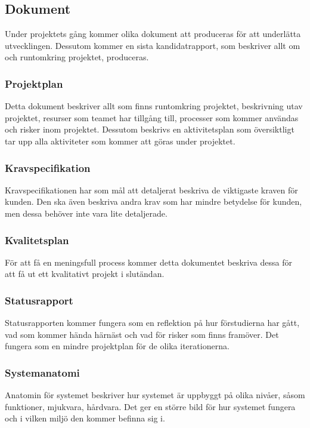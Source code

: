 \subsection{Dokument}
Under projektets gång kommer olika dokument att produceras för att underlätta utvecklingen.
Dessutom kommer en sista kandidatrapport, som beskriver allt om och runtomkring projektet,
produceras.

\subsubsection*{Projektplan}
Detta dokument beskriver allt som finns runtomkring projektet, beskrivning utav projektet, 
resurser som teamet har tillgång till, processer som kommer användas och risker inom projektet.
Dessutom beskrivs en aktivitetsplan som översiktligt tar upp alla aktiviteter som kommer att
göras under projektet.

\subsubsection*{Kravspecifikation}
Kravspecifikationen har som mål att detaljerat beskriva de viktigaste kraven för kunden.
Den ska även beskriva andra krav som har mindre betydelse för kunden, men dessa behöver inte vara
lite detaljerade.

\subsubsection*{Kvalitetsplan}
För att få en meningsfull process kommer detta dokumentet beskriva dessa för att få ut ett 
kvalitativt projekt i slutändan.

\subsubsection*{Statusrapport}
Statusrapporten kommer fungera som en reflektion på hur förstudierna har gått, vad som kommer
hända härnäst och vad för risker som finns framöver. Det fungera som en mindre projektplan för
de olika iterationerna.

\subsubsection*{Systemanatomi}
Anatomin för systemet beskriver hur systemet är uppbyggt på olika nivåer, såsom funktioner, 
mjukvara, hårdvara. Det ger en större bild för hur systemet fungera och i vilken miljö den kommer
befinna sig i.

